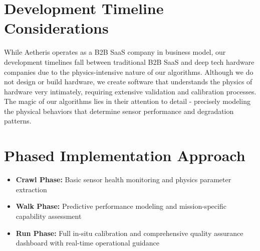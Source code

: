 \documentclass[11pt,letterpaper]{article}
\begin{document}
\section*{Development Timeline Considerations}
While Aetheris operates as a B2B SaaS company in business model, our development timelines fall between traditional B2B SaaS and deep tech hardware companies due to the physics-intensive nature of our algorithms. Although we do not design or build hardware, we create software that understands the physics of hardware very intimately, requiring extensive validation and calibration processes. The magic of our algorithms lies in their attention to detail - precisely modeling the physical behaviors that determine sensor performance and degradation patterns.

\section*{Phased Implementation Approach}
\begin{itemize}[leftmargin=10pt, itemsep=1pt]
    \item \textbf{Crawl Phase:} Basic sensor health monitoring and physics parameter extraction
    \item \textbf{Walk Phase:} Predictive performance modeling and mission-specific capability assessment
    \item \textbf{Run Phase:} Full in-situ calibration and comprehensive quality assurance dashboard with real-time operational guidance
\end{itemize}



\end{document}
